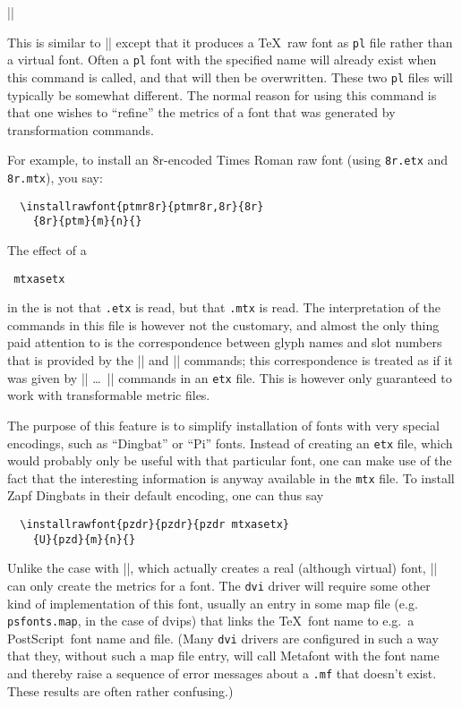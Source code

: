 \documentclass[a4paper]{ltxguide}
\newcommand*{\meta}{\m}
\newcommand{\PS}{Post\-Script\xspace}
\newcommand*{\setfilename}[1]{\texttt{#1}}
\newcommand*{\setdotfilename}[1]{\setfilename{.#1}}
\newcommand*{\setpackagename}[1]{\textsf{#1}}
\newcommand{\dvips}   {\setpackagename{dvips}\xspace}
\newcommand{\pl} {\setfilename{pl}\xspace}
\newcommand{\mtx}{\setfilename{mtx}\xspace}
\newcommand{\etx}{\setfilename{etx}\xspace}
\newcommand{\dvi}{\setfilename{dvi}\xspace}
\begin{document}
\begin{decl}
  |\installrawfont|\\
  \hspace*{1.5em}%
\end{decl}
This is similar to |\installfont| except that it produces
a \TeX\ raw font as \pl file rather than a virtual font. Often a \pl 
font with the specified name will already exist when this command is 
called, and that will then be overwritten. These two \pl files will 
typically be somewhat different.
The normal reason for using this command is that one wishes to 
``refine'' the metrics of a font that was generated by transformation 
commands.

For example, to install an 8r-encoded Times Roman raw font
(using \texttt{8r.etx} and \texttt{8r.mtx}), you say:
\begin{verbatim}
  \installrawfont{ptmr8r}{ptmr8r,8r}{8r}
    {8r}{ptm}{m}{n}{}
\end{verbatim}

The effect of a
\begin{decl}
  \meta{filename}\verb*| mtxasetx|
\end{decl}
in the \meta{etx-list} is not that \meta{filename}\texttt{.etx} is 
read, but that \meta{filename}\texttt{.mtx} is read. The 
interpretation of the commands in this file is however not the 
customary, and almost the only thing paid attention to is the 
correspondence between glyph names and slot numbers that is provided 
by the |\setrawglyph| and |\setscaledrawglyph| commands; this 
correspondence is treated as if it was given by |\setslot| \dots\ 
|\endsetslot| commands in an \etx file. This is however only 
guaranteed to work with transformable metric files.

The purpose of this feature is to simplify installation of fonts with 
very special encodings, such as ``Dingbat'' or ``Pi'' fonts. Instead 
of creating an \etx file, which would probably only be useful with 
that particular font, one can make use of the fact that the 
interesting information is anyway available in the \mtx file. To 
install Zapf Dingbats in their default encoding, one can thus say
\begin{verbatim}
  \installrawfont{pzdr}{pzdr}{pzdr mtxasetx}
    {U}{pzd}{m}{n}{}
\end{verbatim}

Unlike the case with |\installfont|, which actually creates a real 
(although virtual) font, |\installrawfont| can only create the 
metrics for a font. The \dvi driver will require some other kind of 
implementation of this font, usually an entry in some map file (e.g. 
\texttt{psfonts.map}, in the case of \dvips) that links the \TeX\ font 
name to e.g.\ a \PS\ font name and file. (Many \dvi drivers are 
configured in such a way that they, without such a map file entry, 
will call Metafont with the font name and thereby raise a sequence of 
error messages about a \setdotfilename{mf} that doesn't exist. These 
results are often rather confusing.)
\end{document}
